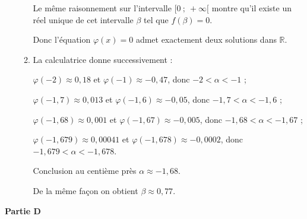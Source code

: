 \documentclass[10pt]{article}
\newcommand{\R}{\mathbb{R}}
\begin{document}
\begin{enumerate}
\begin{enumerate}
Le même raisonnement sur l'intervalle $[0~;~+\infty[$ montre qu'il existe un réel unique de cet intervalle $\beta$ tel que $f(\beta) = 0$.

Donc l'équation $\varphi(x) = 0$ admet exactement deux solutions dans $\R$. 
		\item %
		 
La calculatrice donne successivement :

$\varphi(- 2) \approx 0,18$ et $\varphi(- 1) \approx -0,47$, donc $- 2 < \alpha < - 1$ ;

$\varphi(- 1,7) \approx 0,013$ et $\varphi(- 1,6) \approx -0,05$, donc $- 1,7 < \alpha < - 1,6$ ;

$\varphi(- 1,68) \approx 0,001$ et $\varphi(- 1,67) \approx -0,005$, donc $- 1,68 < \alpha < - 1,67$ ;

$\varphi(- 1,679) \approx 0,00041$ et $\varphi(- 1,678) \approx -0,0002$, donc $- 1,679 < \alpha < - 1,678$.

Conclusion au centième près $\alpha \approx - 1,68$.

De la même façon on obtient $\beta \approx 0,77$. 
	\end{enumerate} 
\end{enumerate}

\bigskip
 
\textbf{Partie D}

\medskip

% 

 
\end{document}
